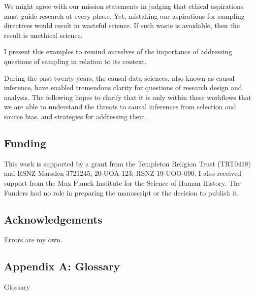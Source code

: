 \documentclass[
  single column]{article}
\begin{document}
We might agree with our mission statements in judging that ethical
aspirations must guide research at every phase. Yet, mistaking our
aspirations for sampling directives would result in wasteful science. If
such waste is avoidable, then the result is unethical science.

I present this examples to remind ourselves of the importance of
addressing questions of sampling in relation to its context.

During the past twenty years, the causal data sciences, also known as
causal inference, have enabled tremendous clarity for questions of
research design and analysis. The following hopes to clarify that it is
only within these workflows that we are able to understand the threats
to causal inferences from selection and source bias, and strategies for
addressing them.

\newpage{}

\subsection{Funding}\label{funding}

This work is supported by a grant from the Templeton Religion Trust
(TRT0418) and RSNZ Marsden 3721245, 20-UOA-123; RSNZ 19-UOO-090. I also
received support from the Max Planck Institute for the Science of Human
History. The Funders had no role in preparing the manuscript or the
decision to publish it.

\subsection{Acknowledgements}\label{acknowledgements}

Errors are my own.

\newpage{}

\subsection{Appendix A: Glossary}\label{appendix-a-glossary}

\begin{table}

\caption{\label{tbl-experiments}Glossary}

\centering{

\glossaryTerms

}

\end{table}%

\newpage{}
\end{document}

